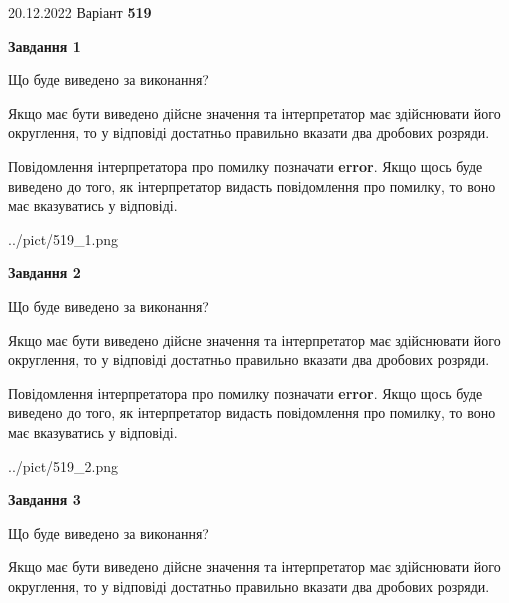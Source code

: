 \documentclass[12pt, ukrainian]{article}
\begin{document}
{20.12.2022 Варіант \No \textbf { 519 }\par}
{
\begin {Large}

{\begin {center}\textbf{Завдання 1}\end {center}}\par
Що буде виведено за виконання? \par

Якщо має бути виведено дійсне значення та інтерпретатор має здійснювати його округлення, 
то у відповіді достатньо правильно вказати два дробових розряди.

Повідомлення інтерпретатора про помилку позначати \textbf{error}.
Якщо щось буде виведено до того, як інтерпретатор видасть повідомлення про помилку, 
то воно має вказуватись у відповіді. \par

\begin{center}
	{../pict/519_1.png}
\end{center}
\newpage

{\begin {center}\textbf{Завдання 2}\end {center}}\par
Що буде виведено за виконання? \par

Якщо має бути виведено дійсне значення та інтерпретатор має здійснювати його округлення, 
то у відповіді достатньо правильно вказати два дробових розряди.

Повідомлення інтерпретатора про помилку позначати \textbf{error}.
Якщо щось буде виведено до того, як інтерпретатор видасть повідомлення про помилку, 
то воно має вказуватись у відповіді. \par

\begin{center}
	{../pict/519_2.png}
\end{center}
\newpage

{\begin {center}\textbf{Завдання 3}\end {center}}\par
Що буде виведено за виконання? \par

Якщо має бути виведено дійсне значення та інтерпретатор має здійснювати його округлення, 
то у відповіді достатньо правильно вказати два дробових розряди.


\end{Large}}
\end{document}
